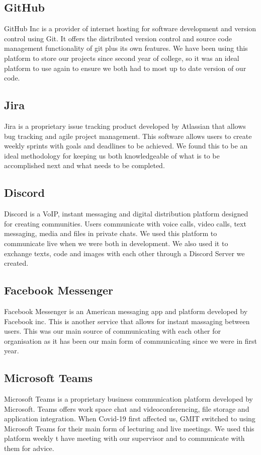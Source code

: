\subsection{GitHub}
GitHub Inc is a provider of internet hosting for software development and version control using Git. It offers the distributed version control and source code management functionality of git plus its own features. We have been using this platform to store our projects since second year of college, so it was an ideal platform to use again to ensure we both had to most up to date version of our code.

\subsection{Jira}
Jira is a proprietary issue tracking product developed by Atlassian that allows bug tracking and agile project management. This software allows users to create weekly sprints with goals and deadlines to be achieved. We found this to be an ideal methodology for keeping us both knowledgeable of what is to be accomplished next and what needs to be completed.

\subsection{Discord}
Discord is a VoIP, instant messaging and digital distribution platform designed for creating communities. Users communicate with voice calls, video calls, text messaging, media and files in private chats. We used this platform to communicate live when we were both in development. We also used it to exchange texts, code and images with each other through a Discord Server we created.

\subsection{Facebook Messenger}
Facebook Messenger is an American messaging app and platform developed by Facebook inc. This is another service that allows for instant massaging between users. This was our main source of communicating with each other for organisation as it has been our main form of communicating since we were in first year.

\subsection{Microsoft Teams}
Microsoft Teams is a proprietary business communication platform developed by Microsoft. Teams offers work space chat and videoconferencing, file storage and application integration. When Covid-19 first affected us, GMIT switched to using Microsoft Teams for their main form of lecturing and live meetings. We used this platform weekly t have meeting with our supervisor and to communicate with them for advice.

